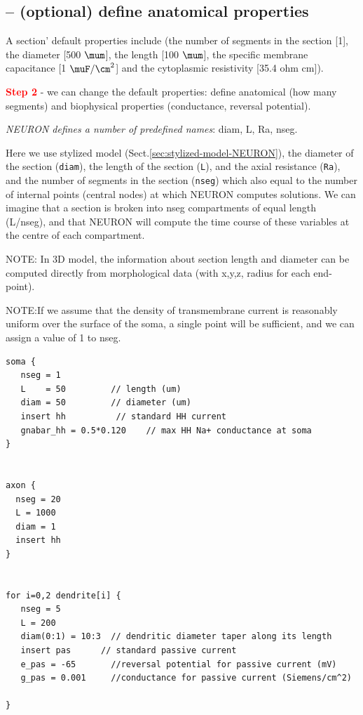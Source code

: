 \subsection{-- (optional) define anatomical properties}

A section' default properties include (the number of segments in the section
[1], the diameter [500 $\mum$], the length [100 $\mum$], the specific membrane
capacitance [1 $\muF/\cm^2$] and the cytoplasmic resistivity [35.4 ohm cm]).

\textcolor{red}{\bf Step 2 } - we can change the default properties: define
anatomical (how many segments) and biophysical properties (conductance,
reversal potential).

{\it NEURON defines a number of predefined names}: diam, L, Ra, nseg. 

Here we use stylized model (Sect.\ref{sec:stylized-model-NEURON}), the diameter
of the section (\verb!diam!), the length of the section (\verb!L!), and the
axial resistance (\verb!Ra!), and the number of segments in the section
(\verb!nseg!) which also equal to the number of internal points (central nodes)
at which NEURON computes solutions. We can imagine that a section is broken into
nseg compartments of equal length (L/nseg), and that NEURON will compute the
time course of these variables at the centre of each compartment.

NOTE: In 3D model, the information about section length and diameter can be
computed directly from morphological data (with x,y,z, radius for each
end-point).

NOTE:If we assume that the density of transmembrane current is reasonably
uniform over the surface of the soma, a single point will be sufficient, and we
can assign a value of 1 to nseg.

\begin{verbatim}
soma { 
   nseg = 1
   L    = 50         // length (um)
   diam = 50         // diameter (um)
   insert hh          // standard HH current
   gnabar_hh = 0.5*0.120    // max HH Na+ conductance at soma
}


axon {
  nseg = 20
  L = 1000
  diam = 1
  insert hh
}


for i=0,2 dendrite[i] {
   nseg = 5
   L = 200
   diam(0:1) = 10:3  // dendritic diameter taper along its length
   insert pas      // standard passive current
   e_pas = -65       //reversal potential for passive current (mV)
   g_pas = 0.001     //conductance for passive current (Siemens/cm^2)

}
\end{verbatim}

